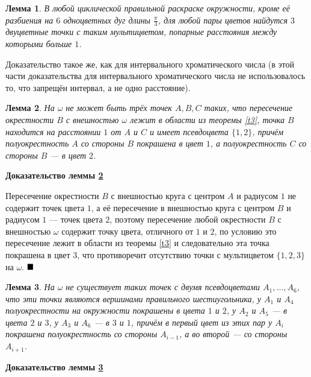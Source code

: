 \documentclass[12pt,a4paper]{article}
\newtheorem{lemma}{Лемма}
\renewcommand{\qed}{$\blacksquare \vspace{5mm}$}
\begin{document}
\begin{lemma} \label{l5.3}
	В любой циклической правильной раскраске окружности, кроме её разбиения на $6$ одноцветных дуг длины $\frac{\pi}{3}$, для любой пары цветов найдутся $3$ двуцветные точки с таким мультицветом, попарные расстояния между которыми больше $1$.
\end{lemma}

Доказательство такое же, как для интервального хроматического числа (в этой части доказательства для интервального хроматического числа не использовалось то, что запрещён интервал, а не одно расстояние). 

\begin{lemma} \label{l5.4}
	На $\omega$ не может быть трёх точек $A, B, C$ таких, что пересечение окрестности $B$ с внешностью $\omega$ лежит в области из теоремы \ref{t3}, точка $B$ находится на расстоянии $1$ от $A$ и $C$ и имеет псевдоцвета $\{1, 2\}$, причём полуокрестность $A$ со стороны $B$ покрашена в цвет $1$, а полуокрестность $C$ со стороны $B$ --- в цвет $2$.
\end{lemma}

\textbf{Доказательство леммы \ref{l5.4}}

	Пересечение окрестности $B$ с внешностью круга с центром $A$ и радиусом $1$ не содержит точек цвета $1$, а её пересечение в внешностью круга с центром $B$ и радиусом $1$ --- точек цвета $2$, поэтому пересечение любой окрестности $B$ с внешностью $\omega$ содержит точку цвета, отличного от $1$ и $2$, по условию это пересечение лежит в области из теоремы \ref{t3} и следовательно эта точка покрашена в цвет $3$, что противоречит отсутствию точки с мультицветом $\{1, 2, 3\}$ на $\omega$. \qed

\begin{lemma} \label{l5.5}
	На $\omega$ не существует таких точек с двумя псевдоцветами $A_1, \ldots, A_6$, что эти точки являются вершинами правильного шестиугольника, у $A_1$ и $A_4$ полуокрестности на окружности покрашены в цвета $1$ и $2$, у $A_2$ и $A_5$ --- в цвета $2$ и $3$, у $A_3$ и $A_6$ --- в $3$ и $1$, причём в первый цвет из этих пар у $A_i$ покрашена полуокрестность со стороны $A_{i-1}$, а во второй --- со стороны $A_{i+1}$.
\end{lemma}

\textbf{Доказательство леммы \ref{l5.5}}
\end{document}
